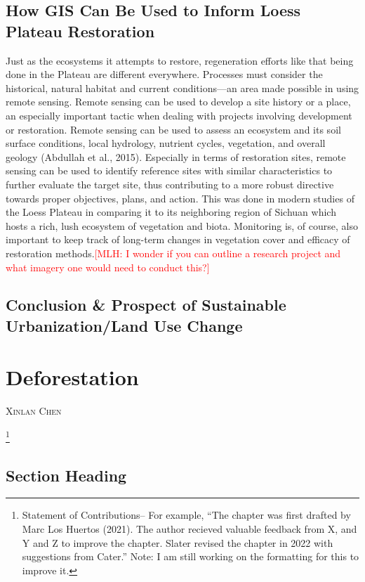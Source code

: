 \documentclass{book}\usepackage{knitr}
\makeatletter
\newcommand{\red}[1]{\textcolor{red}{[MLH: #1]}}
\newcommand{\chapterauthor}[1]{%
  {\parindent0pt\vspace*{-25pt}%
  \linespread{1.1}\large\scshape#1%
  \par\nobreak\vspace*{35pt}}
  \@afterheading%
}
\makeatother
\begin{document}
\begin{knitrout}
\begin{kframe}
{\section{How GIS Can Be Used to Inform Loess Plateau Restoration}

Just as the ecosystems it attempts to restore, regeneration efforts like that being done in the Plateau are different everywhere. Processes must consider the historical, natural habitat and current conditions—an area made possible in using remote sensing. Remote sensing can be used to develop a site history or a place, an especially important tactic when dealing with projects involving development or restoration. Remote sensing can be used to assess an ecosystem and its soil surface conditions, local hydrology, nutrient cycles, vegetation, and overall geology (Abdullah et al., 2015). Especially in terms of restoration sites, remote sensing can be used to identify reference sites with similar characteristics to further evaluate the target site, thus contributing to a more robust directive towards proper objectives, plans, and action. This was done in modern studies of the Loess Plateau in comparing it to its neighboring region of Sichuan which hosts a rich, lush ecosystem of vegetation and biota. Monitoring is, of course, also important to keep track of long-term changes in vegetation cover and efficacy of restoration methods.\red{I wonder if you can outline a research project and what imagery one would need to conduct this?}




\section{Conclusion \& Prospect of Sustainable Urbanization/Land Use Change}


\chapter{Deforestation}\label{ch:deforestation}

\chapterauthor{Xinlan Chen}

\footnote{Statement of Contributions-- For example, ``The chapter was first drafted by Marc Los Huertos (2021). The author recieved valuable feedback from X, and Y and Z to improve the chapter. Slater revised the chapter in 2022 with suggestions from Cater.'' Note: I am still working on the formatting for this to improve it.}

\section{Section Heading}%

}
\end{kframe}
\end{knitrout}
\end{document}
